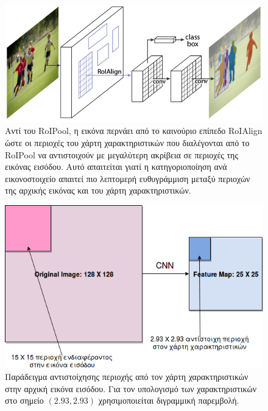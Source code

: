 \begin{figure}
\centering
\includegraphics[width = \textwidth]{figures/RCNN/Mask-RCNN_RoIAlign.png}
\caption[RoIAlign]{Αντί του RoIPool, η εικόνα περνάει από το καινούριο επίπεδο RoIAlign \cite{13} ώστε οι περιοχές του χάρτη χαρακτηριστικών που διαλέγονται από το RoIPool να αντιστοιχούν με μεγαλύτερη ακρίβεια σε περιοχές της εικόνας εισόδου. Αυτό απαιτείται γιατί η κατηγοριοποίηση ανά εικονοστοιχείο  απαιτεί πιο λεπτομερή ευθυγράμμιση μεταξύ περιοχών της αρχικής εικόνας και του χάρτη χαρακτηριστικών.}
\label{fig:Mask_RCNN_RoIAlign}
\end{figure}

\begin{figure}
\centering
\includegraphics[width = \textwidth]{figures/RCNN/Mask-RCNN_RoIAlignExample.png}
\caption[Παράδειγμα RoIAlign]{Παράδειγμα αντιστοίχησης περιοχής από τον χάρτη χαρακτηριστικών στην αρχική εικόνα εισόδου. Για τον υπολογισμό των χαρακτηριστικών στο σημείο $(2.93, 2.93)$ χρησιμοποιείται διγραμμική παρεμβολή.}
\label{fig:Mask_RCNN_RoIAlignExample}
\end{figure}



